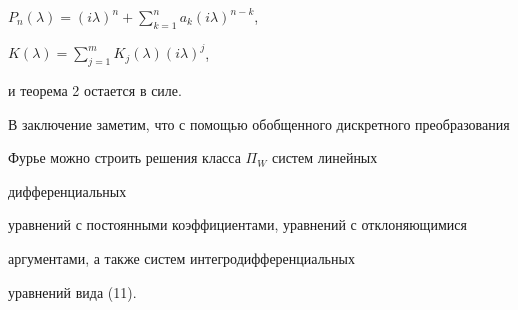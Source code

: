$P_n(\lambda)=(i\lambda)^n+\sum\limits^n_{k=1}a_k (i\lambda)^{n-k}$, 


$K(\lambda)=\sum\limits^m_{j=1}K_j(\lambda)(i\lambda)^j$, 


и теорема 2 остается в силе. 


 


В заключение заметим, что с помощью обобщенного дискретного преобразования  


Фурье можно строить решения класса $\Pi_W$ систем линейных 


дифференциальных  


уравнений с постоянными коэффициентами, уравнений с отклоняющимися  


аргументами, а также систем интегродифференциальных  


уравнений вида (11). 


 


